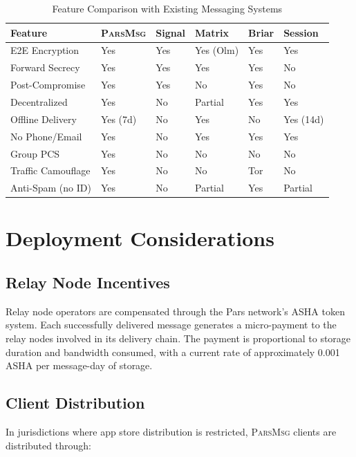 \documentclass[11pt,a4paper]{article}
\newcommand{\protname}{\textsc{ParsMsg}\xspace}
\begin{document}
\begin{table}[H]
\centering
\caption{Feature Comparison with Existing Messaging Systems}
\label{tab:comparison}
\begin{tabularx}{\textwidth}{lXXXXX}
\toprule
\textbf{Feature} & \textbf{\protname} & \textbf{Signal} & \textbf{Matrix} & \textbf{Briar} & \textbf{Session} \\
\midrule
E2E Encryption & Yes & Yes & Yes (Olm) & Yes & Yes \\
Forward Secrecy & Yes & Yes & Yes & Yes & No \\
Post-Compromise & Yes & Yes & No & Yes & No \\
Decentralized & Yes & No & Partial & Yes & Yes \\
Offline Delivery & Yes (7d) & No & Yes & No & Yes (14d) \\
No Phone/Email & Yes & No & Yes & Yes & Yes \\
Group PCS & Yes & No & No & No & No \\
Traffic Camouflage & Yes & No & No & Tor & No \\
Anti-Spam (no ID) & Yes & No & Partial & Yes & Partial \\
\bottomrule
\end{tabularx}
\end{table}

\section{Deployment Considerations}

\subsection{Relay Node Incentives}

Relay node operators are compensated through the Pars network's ASHA token system. Each successfully delivered message generates a micro-payment to the relay nodes involved in its delivery chain. The payment is proportional to storage duration and bandwidth consumed, with a current rate of approximately 0.001 ASHA per message-day of storage.

\subsection{Client Distribution}

In jurisdictions where app store distribution is restricted, \protname clients are distributed through:
\end{document}

